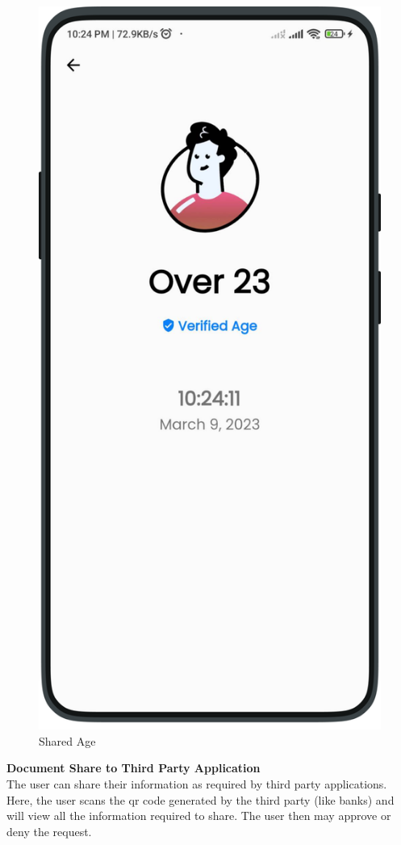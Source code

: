 \begin{multicols}{3}
\begin{figure}[H]
            \includegraphics[width=0.8\linewidth]{images/results/mobile/VerifiedAgeShared.png}
            \caption[Shared Age]{Shared Age}
            \label{fig:VerifiedAgeShared.png}
            \end{figure}
            
        \end{multicols}
        \textbf{Document Share to Third Party Application}\\
        The user can share their information as required by third party applications. Here, the user scans the qr code generated by the third party (like banks) and will view all the information required to share. The user then may approve or deny the request.
